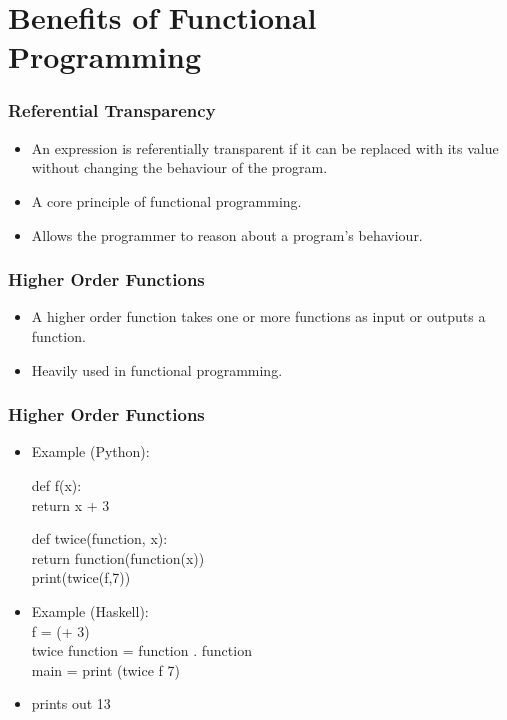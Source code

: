 \documentclass[presentation.tex]{subfiles}
\begin{document}
\section{Benefits of Functional Programming}
\begin{frame}
  \frametitle{Referential Transparency}
    	\begin{itemize}
 	\item An expression is referentially transparent if it can be replaced with its value without changing the behaviour of the program.\\
	\item A core principle of functional programming. \\
	\item Allows the programmer to reason about a program's behaviour.
	  	\end{itemize}
\end{frame}

\begin{frame}
  \frametitle{Higher Order Functions}
     	\begin{itemize}
 	\item A higher order function takes one or more functions as input or outputs a function.
	\item Heavily used in functional programming.
	  	\end{itemize} 
\end{frame}

\begin{frame}
  \frametitle{Higher Order Functions}
	 \begin{itemize}
	 \item Example (Python): \\ \;
	
	{def f(x): \\
	\addtolength{\leftskip}{7mm} return x + 3\\}

	{def twice(function, x): \\
	\addtolength{\leftskip}{7mm} return function(function(x)) \\}
	print(twice(f,7)) \;
	
	\item Example (Haskell): \\ \;
	f = (+ 3) \\
	twice function = function . function \\
	main = print (twice f 7)
	\item prints out 13
	  \end{itemize} 
\end{frame}
\end{document}
